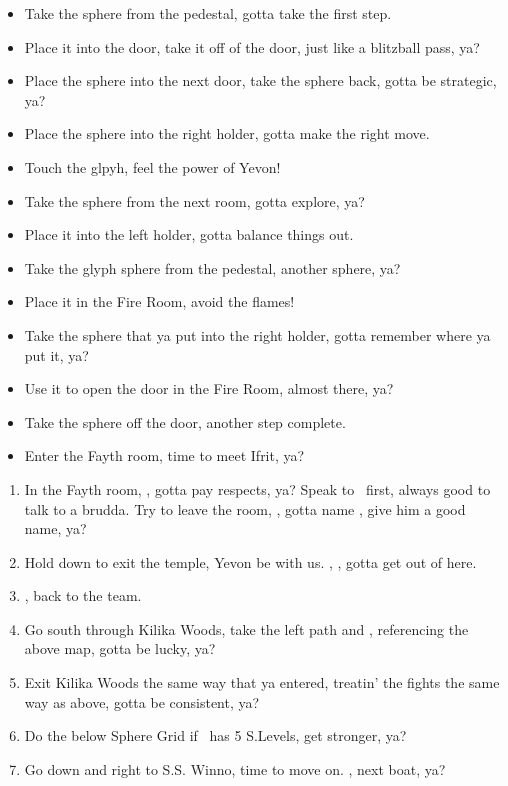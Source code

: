 \begin{trial}
    \begin{itemize}
        \item Take the sphere from the pedestal, gotta take the first step.
        \item Place it into the door, take it off of the door, just like a blitzball pass, ya?
        \item Place the sphere into the next door, take the sphere back, gotta be strategic, ya?
        \item Place the sphere into the right holder, gotta make the right move.
        \item Touch the glpyh, feel the power of Yevon!
        \item Take the sphere from the next room, gotta explore, ya?
        \item Place it into the left holder, gotta balance things out.
        \item Take the glyph sphere from the pedestal, another sphere, ya?
        \item Place it in the Fire Room, avoid the flames!
        \item Take the sphere that ya put into the right holder, gotta remember where ya put it, ya?
        \item Use it to open the door in the Fire Room, almost there, ya?
        \item Take the sphere off the door, another step complete.
        \item Enter the Fayth room, time to meet Ifrit, ya?
    \end{itemize}
\end{trial}
\begin{enumerate}[resume]
    \item In the Fayth room, \sd, gotta pay respects, ya? Speak to \wakka\ first, always good to talk to a brudda. Try to leave the room, \sd, gotta name \ifrit, give him a good name, ya?
    \item Hold down to exit the temple, Yevon be with us. \cs[0:40], \sd, gotta get out of here.
    \item \formation{\tidus}{\wakka}{\lulu}, back to the team.
    \item Go south through Kilika Woods, take the left path and , referencing the above map, gotta be lucky, ya?
    \item Exit Kilika Woods the same way that ya entered, treatin' the fights the same way as above, gotta be consistent, ya?
    \item Do the below Sphere Grid if \tidus\ has 5 S.Levels, get stronger, ya?
    \item Go down and right to S.S. Winno, time to move on. \sd, next boat, ya?
\end{enumerate}